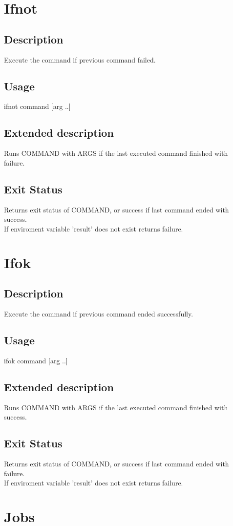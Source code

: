 \documentclass[12pt,a4paper]{report}
\begin{document}
\chapter{Ifnot}
\section{Description}
Execute the command if previous command failed.
\section{Usage}
ifnot command [arg ..]
\section{Extended description}
Runs COMMAND with ARGS if the last executed command finished with failure.
\section{Exit Status}
Returns exit status of COMMAND, or success if last command ended with success.\\
If enviroment variable 'result' does not exist returns failure.
\newpage

\chapter{Ifok}
\section{Description}
Execute the command if previous command ended successfully.
\section{Usage}
ifok command [arg ..]
\section{Extended description}
Runs COMMAND with ARGS if the last executed command finished with success.
\section{Exit Status}
Returns exit status of COMMAND, or success if last command ended with failure.\\
If enviroment variable 'result' does not exist returns failure.
\newpage

\chapter{Jobs}
\end{document}
